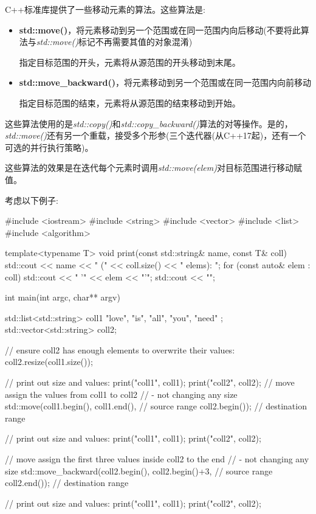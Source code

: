 C++标准库提供了一些移动元素的算法。这些算法是:

\begin{itemize}
	\item \textbf{std::move()}，将元素移动到另一个范围或在同一范围内向后移动(不要将此算法与\textit{std::move()}标记不再需要其值的对象混淆)

	指定目标范围的开头，元素将从源范围的开头移动到末尾。
	\item \textbf{std::move_backward()}，将元素移动到另一个范围或在同一范围内向前移动

	指定目标范围的结束，元素将从源范围的结束移动到开始。
\end{itemize}

这些算法使用的是\textit{std::copy()}和\textit{std::copy_backward()}算法的对等操作。是的，\textit{std::move()}还有另一个重载，接受多个形参(三个迭代器(从C++17起)，还有一个可选的并行执行策略)。

这些算法的效果是在迭代每个元素时调用\textit{std::move(elem)}对目标范围进行移动赋值。

考虑以下例子:

\begin{cppcode}
#include <iostream>
#include <string>
#include <vector>
#include <list>
#include <algorithm>

template<typename T>
void print(const std::string& name, const T& coll)
{
	std::cout << name << " (" << coll.size() << " elems): ";
	for (const auto& elem : coll) {
		std::cout << " '" << elem << "'";
	}
	std::cout << "\n";
}

int main(int argc, char** argv)
{
	std::list<std::string> coll1 { "love", "is", "all", "you", "need" };
	std::vector<std::string> coll2;
	
	// ensure coll2 has enough elements to overwrite their values:
	coll2.resize(coll1.size());
	
	// print out size and values:
	print("coll1", coll1);
	print("coll2", coll2);
	// move assign the values from coll1 to coll2
	// - not changing any size
	std::move(coll1.begin(), coll1.end(), // source range
	coll2.begin()); // destination range
	
	// print out size and values:
	print("coll1", coll1);
	print("coll2", coll2);
	
	// move assign the first three values inside coll2 to the end
	// - not changing any size
	std::move_backward(coll2.begin(), coll2.begin()+3, // source range
	coll2.end()); // destination range
	
	// print out size and values:
	print("coll1", coll1);
	print("coll2", coll2);
}
\end{cppcode}

